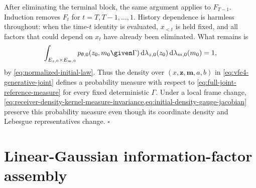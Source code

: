 After eliminating the terminal block, the same argument applies to $F_{T-1}$.  Induction removes $F_t$ for $t=T,T-1,\ldots,1$.  History dependence is harmless throughout: when the time-$t$ identity is evaluated, $x_{<t}$ is held fixed, and all factors that could depend on $x_t$ have already been eliminated.  What remains is
\begin{equation}
\int_{E_{z,0}\times E_{m,0}}
p_{\theta,0}(z_0,m_0\given\Gamma)
\mathop{\mathrm d\lambda_{z,0}(z_0)}
\mathop{\mathrm d\lambda_{m,0}(m_0)}
=1,
\label{eq:normalization-proof-initial-remainder}
\end{equation}
by \cref{eq:normalized-initial-law}.  Thus the density over $(x,\boldsymbol z,\boldsymbol m,a,b)$ in \cref{eq:vfe4-generative-joint} defines a probability measure with respect to \cref{eq:full-joint-reference-measure} for every fixed deterministic $\Gamma$.  Under a local frame change, \cref{eq:receiver-density-kernel-measure-invariance,eq:initial-density-gauge-jacobian} preserve this probability measure even though its coordinate density and Lebesgue representatives change.  \hfill$\square$

\section{Linear-Gaussian information-factor assembly}

